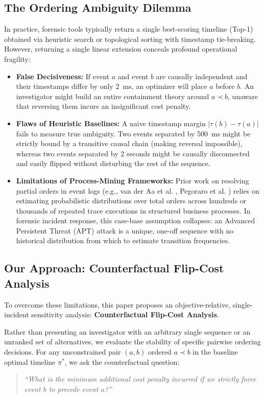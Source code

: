 \documentclass[journal]{IEEEtran}
\begin{document}
\subsection{The Ordering Ambiguity Dilemma}
In practice, forensic tools typically return a single best-scoring timeline (Top-1) obtained via heuristic search or topological sorting with timestamp tie-breaking. However, returning a single linear extension conceals profound operational fragility:
\begin{itemize}
    \item \textbf{False Decisiveness:} If event $a$ and event $b$ are causally independent and their timestamps differ by only 2~ms, an optimizer will place $a$ before $b$. An investigator might build an entire containment theory around $a \prec b$, unaware that reversing them incurs an insignificant cost penalty.
    \item \textbf{Flaws of Heuristic Baselines:} A naive timestamp margin $|\tau(b) - \tau(a)|$ fails to measure true ambiguity. Two events separated by 500~ms might be strictly bound by a transitive causal chain (making reversal impossible), whereas two events separated by 2 seconds might be causally disconnected and easily flipped without disturbing the rest of the sequence.
    \item \textbf{Limitations of Process-Mining Frameworks:} Prior work on resolving partial orders in event logs (e.g., van der Aa et al. \cite{vanderAa2020}, Pegoraro et al. \cite{Pegoraro2020a, Pegoraro2021}) relies on estimating probabilistic distributions over total orders across hundreds or thousands of repeated trace executions in structured business processes. In forensic incident response, this case-base assumption collapses: an Advanced Persistent Threat (APT) attack is a unique, one-off sequence with no historical distribution from which to estimate transition frequencies.
\end{itemize}

\subsection{Our Approach: Counterfactual Flip-Cost Analysis}
To overcome these limitations, this paper proposes an objective-relative, single-incident sensitivity analysis: \textbf{Counterfactual Flip-Cost Analysis}. 

Rather than presenting an investigator with an arbitrary single sequence or an unranked set of alternatives, we evaluate the stability of specific pairwise ordering decisions. For any unconstrained pair $(a, b)$ ordered $a \prec b$ in the baseline optimal timeline $\pi^*$, we ask the counterfactual question:
\begin{quote}
\emph{``What is the minimum additional cost penalty incurred if we strictly force event $b$ to precede event $a$?''}
\end{quote}
\end{document}
